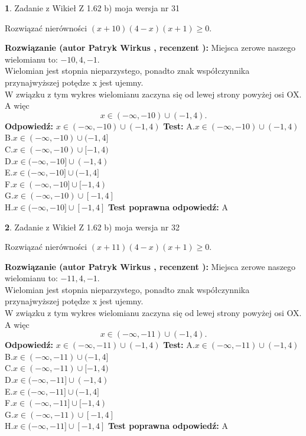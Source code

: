 \documentclass[12pt, a4paper]{article}
\theoremstyle{definition} %
\newtheorem{zad}{}
\newcommand{\zadStart}[1]{\begin{zad}#1\newline}
\newcommand{\zadStop}{\end{zad}}
\newcommand{\rozwStart}[2]{\noindent \textbf{Rozwiązanie (autor #1 , recenzent #2): }\newline}
\newcommand{\rozwStop}{\newline}
\newcommand{\odpStart}{\noindent \textbf{Odpowiedź:}\newline}
\newcommand{\odpStop}{\newline}
\newcommand{\testStart}{\noindent \textbf{Test:}\newline}
\newcommand{\testStop}{\newline}
\newcommand{\kluczStart}{\noindent \textbf{Test poprawna odpowiedź:}\newline}
\newcommand{\kluczStop}{\newline}
\begin{document}
\zadStart{Zadanie z Wikieł Z 1.62 b) moja wersja nr 31}

Rozwiązać nierówności $(x+10)(4-x)(x+1)\ge0$.
\zadStop
\rozwStart{Patryk Wirkus}{}
Miejsca zerowe naszego wielomianu to: $-10, 4, -1$.\\
Wielomian jest stopnia nieparzystego, ponadto znak współczynnika przy\linebreak najwyższej potędze x jest ujemny.\\ W związku z tym wykres wielomianu zaczyna się od lewej strony powyżej osi OX. A więc $$x \in (-\infty,-10) \cup (-1,4).$$
\rozwStop
\odpStart
$x \in (-\infty,-10) \cup (-1,4)$
\odpStop
\testStart
A.$x \in (-\infty,-10) \cup (-1,4)$\\
B.$x \in (-\infty,-10) \cup (-1,4]$\\
C.$x \in (-\infty,-10) \cup [-1,4)$\\
D.$x \in (-\infty,-10] \cup (-1,4)$\\
E.$x \in (-\infty,-10] \cup (-1,4]$\\
F.$x \in (-\infty,-10] \cup [-1,4)$\\
G.$x \in (-\infty,-10) \cup [-1,4]$\\
H.$x \in (-\infty,-10] \cup [-1,4]$
\testStop
\kluczStart
A
\kluczStop



\zadStart{Zadanie z Wikieł Z 1.62 b) moja wersja nr 32}

Rozwiązać nierówności $(x+11)(4-x)(x+1)\ge0$.
\zadStop
\rozwStart{Patryk Wirkus}{}
Miejsca zerowe naszego wielomianu to: $-11, 4, -1$.\\
Wielomian jest stopnia nieparzystego, ponadto znak współczynnika przy\linebreak najwyższej potędze x jest ujemny.\\ W związku z tym wykres wielomianu zaczyna się od lewej strony powyżej osi OX. A więc $$x \in (-\infty,-11) \cup (-1,4).$$
\rozwStop
\odpStart
$x \in (-\infty,-11) \cup (-1,4)$
\odpStop
\testStart
A.$x \in (-\infty,-11) \cup (-1,4)$\\
B.$x \in (-\infty,-11) \cup (-1,4]$\\
C.$x \in (-\infty,-11) \cup [-1,4)$\\
D.$x \in (-\infty,-11] \cup (-1,4)$\\
E.$x \in (-\infty,-11] \cup (-1,4]$\\
F.$x \in (-\infty,-11] \cup [-1,4)$\\
G.$x \in (-\infty,-11) \cup [-1,4]$\\
H.$x \in (-\infty,-11] \cup [-1,4]$
\testStop
\kluczStart
A
\kluczStop
\end{document}
